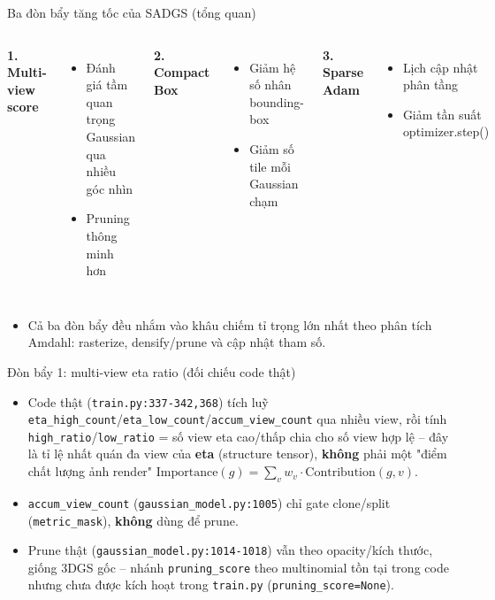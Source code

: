 \begin{frame}{Ba đòn bẩy tăng tốc của SADGS (tổng quan)}
\begin{columns}[t]
\centering
\textbf{1. Multi-view score}
\begin{itemize}
    \footnotesize
    \item Đánh giá tầm quan trọng Gaussian qua nhiều góc nhìn
    \item Pruning thông minh hơn
\end{itemize}
\centering
\textbf{2. Compact Box}
\begin{itemize}
    \footnotesize
    \item Giảm hệ số nhân bounding-box
    \item Giảm số tile mỗi Gaussian chạm
\end{itemize}
\centering
\textbf{3. Sparse Adam}
\begin{itemize}
    \footnotesize
    \item Lịch cập nhật phân tầng
    \item Giảm tần suất optimizer.step()
\end{itemize}
\end{columns}
\vspace{0.4cm}
\begin{itemize}
    \item Cả ba đòn bẩy đều nhắm vào khâu chiếm tỉ trọng lớn nhất theo phân tích Amdahl: rasterize, densify/prune và cập nhật tham số.
\end{itemize}
\end{frame}

\begin{frame}{Đòn bẩy 1: multi-view eta ratio (đối chiếu code thật)}
\begin{itemize}
    \item Code thật (\texttt{train.py:337-342,368}) tích luỹ \texttt{eta\_high\_count}/\texttt{eta\_low\_count}/\texttt{accum\_view\_count} qua nhiều view, rồi tính \texttt{high\_ratio}/\texttt{low\_ratio} = số view eta cao/thấp chia cho số view hợp lệ -- đây là tỉ lệ nhất quán đa view của \textbf{eta} (structure tensor), \textbf{không} phải một "điểm chất lượng ảnh render" $\text{Importance}(g)=\sum_v w_v\cdot\text{Contribution}(g,v)$.
    \item \texttt{accum\_view\_count} (\texttt{gaussian\_model.py:1005}) chỉ gate clone/split (\texttt{metric\_mask}), \textbf{không} dùng để prune.
    \item Prune thật (\texttt{gaussian\_model.py:1014-1018}) vẫn theo opacity/kích thước, giống 3DGS gốc -- nhánh \texttt{pruning\_score} theo multinomial tồn tại trong code nhưng chưa được kích hoạt trong \texttt{train.py} (\texttt{pruning\_score=None}).
\end{itemize}
\end{frame}

